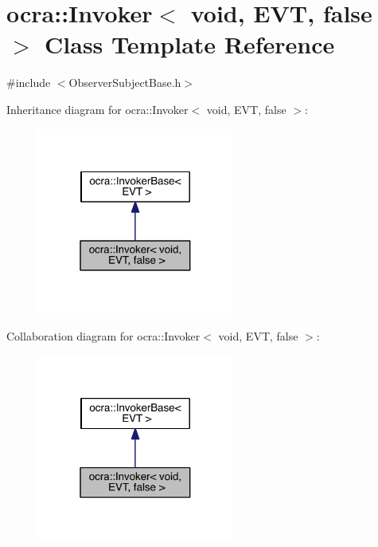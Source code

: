 \hypertarget{classocra_1_1Invoker_3_01void_00_01EVT_00_01false_01_4}{}\section{ocra\+:\+:Invoker$<$ void, E\+VT, false $>$ Class Template Reference}
\label{classocra_1_1Invoker_3_01void_00_01EVT_00_01false_01_4}


{\ttfamily \#include $<$Observer\+Subject\+Base.\+h$>$}



Inheritance diagram for ocra\+:\+:Invoker$<$ void, E\+VT, false $>$\+:\nopagebreak
\begin{figure}[H]
\begin{center}
\leavevmode
\includegraphics[width=184pt]{de/dd7/classocra_1_1Invoker_3_01void_00_01EVT_00_01false_01_4__inherit__graph}
\end{center}
\end{figure}


Collaboration diagram for ocra\+:\+:Invoker$<$ void, E\+VT, false $>$\+:\nopagebreak
\begin{figure}[H]
\begin{center}
\leavevmode
\includegraphics[width=184pt]{df/ddb/classocra_1_1Invoker_3_01void_00_01EVT_00_01false_01_4__coll__graph}
\end{center}
\end{figure}
